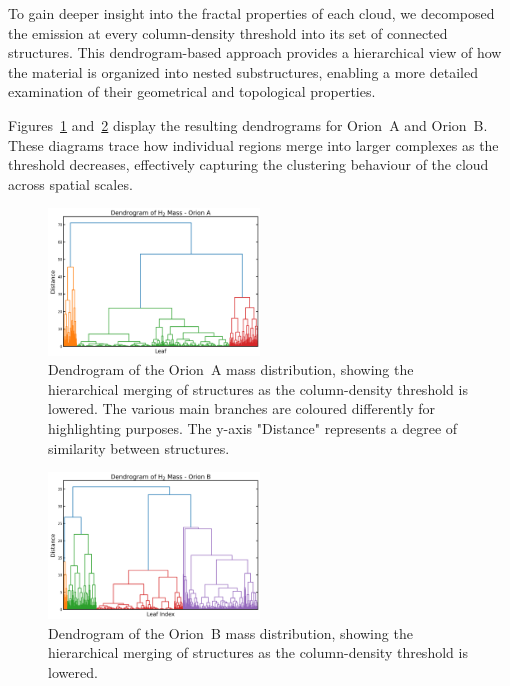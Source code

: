 To gain deeper insight into the fractal properties of each cloud, we decomposed the emission at every column-density threshold into its set of connected structures. This dendrogram-based approach provides a hierarchical view of how the material is organized into nested substructures, enabling a more detailed examination of their geometrical and topological properties.

Figures~\ref{fig:dendrogram_A} and~\ref{fig:dendrogram_B} display the resulting dendrograms for Orion~A and Orion~B. These diagrams trace how individual regions merge into larger complexes as the threshold decreases, effectively capturing the clustering behaviour of the cloud across spatial scales.

\begin{figure}[t]
    \centering
    \includegraphics[width=0.5\textwidth]{figures/dendogram_A.png}
    \caption{Dendrogram of the Orion~A mass distribution, showing the hierarchical merging of structures as the column-density threshold is lowered. The various main branches are coloured differently for highlighting purposes. The y-axis "Distance" represents a degree of similarity between structures. }
    \label{fig:dendrogram_A}
\end{figure}

\begin{figure}[t]
    \centering
    \includegraphics[width=0.5\textwidth]{figures/dendogram_B.png}
    \caption{Dendrogram of the Orion~B mass distribution, showing the hierarchical merging of structures as the column-density threshold is lowered.}
    \label{fig:dendrogram_B}
\end{figure}

